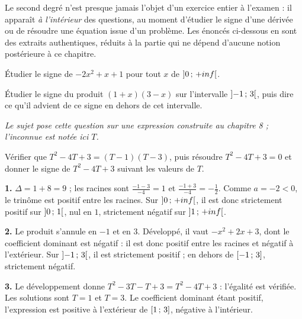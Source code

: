 \begin{annales}
Le second degré n'est presque jamais l'objet d'un exercice entier à
l'examen : il apparaît \emph{à l'intérieur} des questions, au moment
d'étudier le signe d'une dérivée ou de résoudre une équation issue d'un
problème. Les énoncés ci-dessous en sont des extraits authentiques, réduits à
la partie qui ne dépend d'aucune notion postérieure à ce chapitre.

Étudier le signe de $-2x^{2}+x+1$ pour tout $x$ de $\left]0\,;\,+inf\right[$.

Étudier le signe du produit $(1+x)(3-x)$ sur l'intervalle
$\left]-1\,;\,3\right[$, puis dire ce qu'il advient de ce signe en dehors de
cet intervalle.

\emph{Le sujet pose cette question sur une expression construite au
chapitre 8 ; l'inconnue est notée ici $T$.}

Vérifier que $T^{2}-4T+3 = (T-1)(T-3)$, puis résoudre $T^{2}-4T+3 = 0$ et
donner le signe de $T^{2}-4T+3$ suivant les valeurs de $T$.
\end{annales}

\begin{corrige}[annales]
\textbf{1.} $\Delta = 1+8 = 9$ ; les racines sont
$\frac{-1-3}{-4} = 1$ et $\frac{-1+3}{-4} = -\frac12$. Comme $a = -2 < 0$, le
trinôme est positif entre les racines. Sur
$\left]0\,;\,+inf\right[$, il est donc strictement positif sur
$\left]0\,;\,1\right[$, nul en $1$, strictement négatif sur
$\left]1\,;\,+inf\right[$.

\textbf{2.} Le produit s'annule en $-1$ et en $3$. Développé, il vaut
$-x^{2}+2x+3$, dont le coefficient dominant est négatif : il est donc positif
entre les racines et négatif à l'extérieur. Sur $\left]-1\,;\,3\right[$, il est
strictement positif ; en dehors de $\left[-1\,;\,3\right]$, strictement négatif.

\textbf{3.} Le développement donne $T^{2}-3T-T+3 = T^{2}-4T+3$ : l'égalité
est vérifiée. Les solutions sont $T = 1$ et $T = 3$. Le coefficient dominant
étant positif, l'expression est positive à l'extérieur de
$\left[1\,;\,3\right]$, négative à l'intérieur.
\end{corrige}

